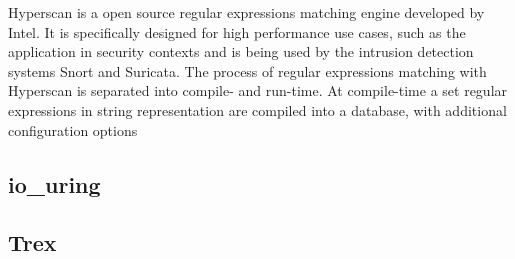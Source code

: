 Hyperscan is a open source regular expressions matching engine developed by Intel. 
It is specifically designed for high performance use cases, such as the application in security contexts and is being used by the intrusion detection systems Snort and Suricata.  
The process of regular expressions matching with Hyperscan is separated into compile- and run-time. At compile-time a set regular expressions in string representation are compiled into a 
database, with additional configuration options  

\subsection{io\_uring}
\label{sec:io_uring}

\subsection{Trex}
\label{sec:trex}

